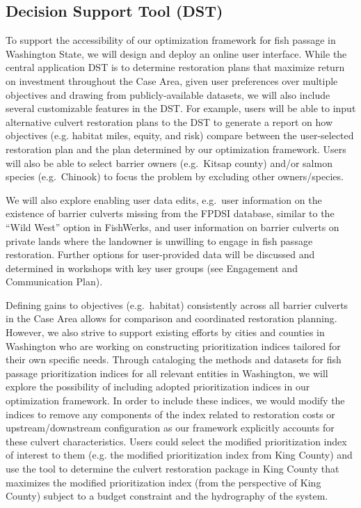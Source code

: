 \subsection*{Decision Support Tool (DST)}

To support the accessibility of our optimization framework for fish passage in Washington State, we will design and deploy an online user interface. While the central application DST is to determine restoration plans that maximize return on investment throughout the Case Area, given user preferences over multiple objectives and drawing from publicly-available datasets, we will also include several customizable features in the DST. For example, users will be able to input alternative culvert restoration plans to the DST to generate a report on how objectives (e.g. habitat miles, equity, and risk) compare between the user-selected restoration plan and the plan determined by our optimization framework. Users will also be able to select barrier owners (e.g.\ Kitsap county) and/or salmon species (e.g.\ Chinook) to focus the problem by excluding other owners/species. 

We will also explore enabling user data edits, e.g.\ user information on the existence of barrier culverts missing from the FPDSI database, similar to the ``Wild West'' option in FishWerks, and user information on barrier culverts on private lands where the landowner is unwilling to engage in fish passage restoration. Further options for user-provided data will be discussed and determined in workshops with key user groups (see Engagement and Communication Plan).

Defining gains to objectives (e.g.\ habitat) consistently across all barrier culverts in the Case Area allows for comparison and coordinated restoration planning. However, we also strive to support existing efforts by cities and counties in Washington who are working on constructing prioritization indices tailored for their own specific needs. Through cataloging the methods and datasets for fish passage prioritization indices for all relevant entities in Washington, we will explore the possibility of including adopted prioritization indices in our optimization framework. In order to include these indices, we would modify the indices to remove any components of the index related to restoration costs or upstream/downstream configuration as our framework explicitly accounts for these culvert characteristics. Users could select the modified prioritization index of interest to them (e.g. the modified prioritization index from King County) and use the tool to determine the culvert restoration package in King County that maximizes the modified prioritization index (from the perspective of King County) subject to a budget constraint and the hydrography of the system.

